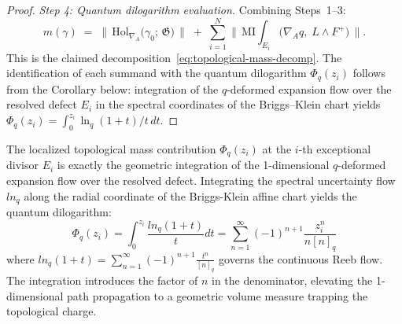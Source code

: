 \begin{proof}
\emph{Step 4: Quantum dilogarithm evaluation.}\;
Combining Steps~1--3:
\[
  m(\gamma)
  \;=\;
  \bigl\lVert\,
  \mathrm{Hol}_{\nabla_A}\!\bigl(\gamma_0;\, \mathfrak{G}\bigr)
  \,\bigr\rVert
  \;+\;
  \sum_{i=1}^{N}
  \bigl\lVert\,
  \mathrm{MI}\!\!\int_{E_i}
  \bigl(\nabla_A q,\; L \wedge F^+\bigr)
  \,\bigr\rVert.
\]
This is the claimed decomposition~\eqref{eq:topological-mass-decomp}.
The identification of each summand with the quantum dilogarithm
$\Phi_q(z_i)$ follows from the Corollary below: integration of the
$q$-deformed expansion flow over the resolved defect $E_i$ in the
spectral coordinates of the Briggs--Klein chart yields
$\Phi_q(z_i) = \int_0^{z_i} \ln_q(1+t)/t\, dt$.
\end{proof}

\begin{corollary}
The localized topological mass contribution $\Phi_q(z_i)$ at the $i$-th exceptional divisor $E_i$ is exactly the geometric integration of the 1-dimensional $q$-deformed expansion flow over the resolved defect. Integrating the spectral uncertainty flow $ln_q$ along the radial coordinate of the Briggs-Klein affine chart yields the quantum dilogarithm:
\begin{equation}
\Phi_q(z_i) = \int_0^{z_i} \frac{ln_q(1+t)}{t} dt = \sum_{n=1}^\infty (-1)^{n+1} \frac{z_i^n}{n [n]_q}
\end{equation}
where $ln_q(1+t) = \sum_{n=1}^\infty (-1)^{n+1} \frac{t^n}{[n]_q}$ governs the continuous Reeb flow. The integration introduces the factor of $n$ in the denominator, elevating the 1-dimensional path propagation to a geometric volume measure trapping the topological charge.
\end{corollary}

